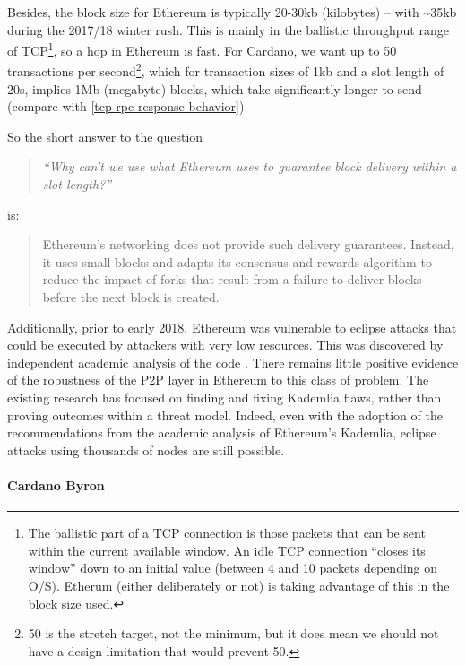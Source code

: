 \documentclass[11pt,a4paper]{article}
\begin{document}
Besides, the block size for Ethereum is typically 20-30kb (kilobytes) --
with \textasciitilde{}35kb during the 2017/18 winter rush. This is
mainly in the ballistic throughput range of TCP\footnote{The ballistic
  part of a TCP connection is those packets that can be sent within the
  current available window. An idle TCP connection ``closes its window''
  down to an initial value (between 4 and 10 packets depending on O/S).
  Etherum (either deliberately or not) is taking advantage of this in
  the block size used.}, so a hop in Ethereum is fast. For Cardano, we
want up to 50 transactions per second\footnote{50 is the stretch target,
  not the minimum, but it does mean we should not have a design
  limitation that would prevent 50.}, which for transaction sizes of 1kb
and a slot length of 20s, implies 1Mb (megabyte) blocks, which take
significantly longer to send (compare with \cref{tcp-rpc-response-behavior}).

So the short answer to the question

\begin{quote}
\emph{``Why can't we use what Ethereum uses to guarantee block delivery
within a slot length?'' }
\end{quote}

is:

\begin{quote}
Ethereum's networking does not provide such delivery guarantees.
Instead, it uses small blocks and adapts its consensus and rewards
algorithm to reduce the impact of forks that result from a failure to
deliver blocks before the next block is created.
\end{quote}

Additionally, prior to early 2018, Ethereum was vulnerable to eclipse
attacks that could be executed by attackers with very low resources.
This was discovered by independent academic analysis of the code
\cite{MHG18}. There remains little positive evidence of the robustness of
the P2P layer in Ethereum to this class of problem. The existing
research has focused on finding and fixing Kademlia flaws, rather than
proving outcomes within a threat model. Indeed, even with the adoption
of the recommendations from the academic analysis of Ethereum's
Kademlia, eclipse attacks using thousands of nodes are still possible.

\paragraph{Cardano Byron}
\end{document}
